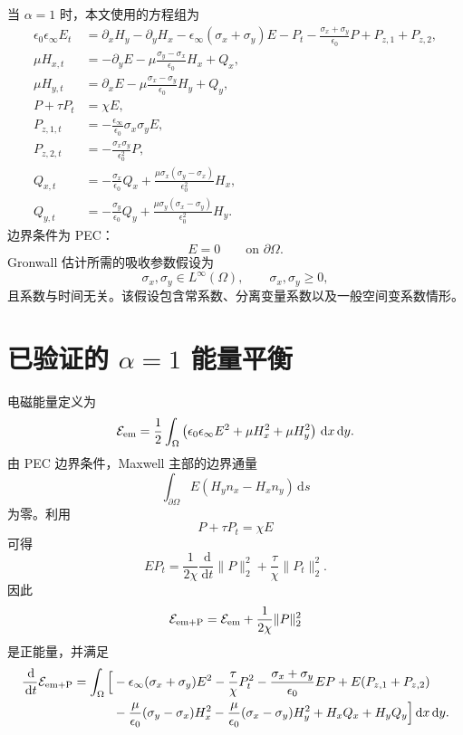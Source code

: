 \documentclass[UTF8,a4paper,12pt]{ctexart}
\newcommand{\dd}{\,\mathrm{d}}
\newcommand{\sx}{\sigma_x}
\newcommand{\sy}{\sigma_y}
\newcommand{\Ecal}{\mathcal E}
\begin{document}
当 \(\alpha=1\) 时，本文使用的方程组为
\begin{equation}
\begin{aligned}
\epsilon_0\epsilon_\infty E_t
&= \partial_xH_y-\partial_yH_x
   -\epsilon_\infty(\sx+\sy)E
   -P_t-\frac{\sx+\sy}{\epsilon_0}P
   +P_{z,1}+P_{z,2},\\
\mu H_{x,t}
&= -\partial_yE-\mu\frac{\sy-\sx}{\epsilon_0}H_x+Q_x,\\
\mu H_{y,t}
&= \partial_xE-\mu\frac{\sx-\sy}{\epsilon_0}H_y+Q_y,\\
P+\tau P_t&=\chi E,\\
P_{z,1,t}&=-\frac{\epsilon_\infty}{\epsilon_0}\sx\sy E,\\
P_{z,2,t}&=-\frac{\sx\sy}{\epsilon_0^2}P,\\
Q_{x,t}&=-\frac{\sx}{\epsilon_0}Q_x
  +\frac{\mu\sx(\sy-\sx)}{\epsilon_0^2}H_x,\\
Q_{y,t}&=-\frac{\sy}{\epsilon_0}Q_y
  +\frac{\mu\sy(\sx-\sy)}{\epsilon_0^2}H_y .
\end{aligned}
\label{eq:model}
\end{equation}
边界条件为 PEC：
\[
E=0\qquad\text{on }\partial\Omega .
\]
Gronwall 估计所需的吸收参数假设为
\[
\sx,\sy\in L^\infty(\Omega),\qquad \sx,\sy\ge0,
\]
且系数与时间无关。该假设包含常系数、分离变量系数以及一般空间变系数情形。

\section{已验证的 \texorpdfstring{\(\alpha=1\)}{alpha=1} 能量平衡}

电磁能量定义为
\[
\Ecal_{\rm em}
=\frac12\int_\Omega
\left(\epsilon_0\epsilon_\infty E^2+\mu H_x^2+\mu H_y^2\right)\dd x\dd y .
\]
由 PEC 边界条件，Maxwell 主部的边界通量
\[
\int_{\partial\Omega}E(H_y n_x-H_x n_y)\dd s
\]
为零。利用
\[
P+\tau P_t=\chi E
\]
可得
\[
E P_t=\frac{1}{2\chi}\frac{\dd}{\dd t}\|P\|_2^2
+\frac{\tau}{\chi}\|P_t\|_2^2 .
\]
因此
\[
\Ecal_{\rm em+P}
=\Ecal_{\rm em}+\frac1{2\chi}\|P\|_2^2
\]
是正能量，并满足
\begin{equation}
\begin{aligned}
\frac{\dd}{\dd t}\Ecal_{\rm em+P}
=\int_\Omega\Big[
&-\epsilon_\infty(\sx+\sy)E^2
-\frac{\tau}{\chi}P_t^2
-\frac{\sx+\sy}{\epsilon_0}EP
+E(P_{z,1}+P_{z,2})\\
&-\frac{\mu}{\epsilon_0}(\sy-\sx)H_x^2
-\frac{\mu}{\epsilon_0}(\sx-\sy)H_y^2
+H_xQ_x+H_yQ_y
\Big]\dd x\dd y .
\end{aligned}
\label{eq:em-p-balance}
\end{equation}
\end{document}
